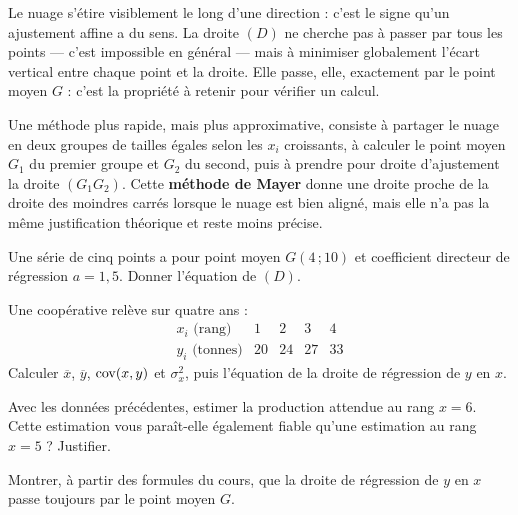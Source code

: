 \begin{visualisation}
\begin{center}
\end{center}

Le nuage s'étire visiblement le long d'une direction : c'est le signe qu'un
ajustement affine a du sens. La droite $(D)$ ne cherche pas à passer par tous
les points — c'est impossible en général — mais à minimiser globalement
l'écart vertical entre chaque point et la droite. Elle passe, elle,
exactement par le point moyen $G$ : c'est la propriété à retenir pour vérifier
un calcul.
\end{visualisation}

\begin{remarque}
Une méthode plus rapide, mais plus approximative, consiste à partager le
nuage en deux groupes de tailles égales selon les $x_{i}$ croissants, à
calculer le point moyen $G_{1}$ du premier groupe et $G_{2}$ du second, puis
à prendre pour droite d'ajustement la droite $\left(G_{1}G_{2}\right)$. Cette
\textbf{méthode de Mayer} donne une droite proche de la droite des moindres
carrés lorsque le nuage est bien aligné, mais elle n'a pas la même
justification théorique et reste moins précise.
\end{remarque}

\begin{entrainement}
\exo[\niveau{1}] Une série de cinq points a pour point moyen
$G(4\,;10)$ et coefficient directeur de régression $a = 1{,}5$. Donner
l'équation de $(D)$.

\exo[\niveau{2}] Une coopérative relève sur quatre ans :
\[
  \begin{array}{c|cccc}
    x_{i} \text{ (rang)} & 1 & 2 & 3 & 4 \\
    \hline
    y_{i} \text{ (tonnes)} & 20 & 24 & 27 & 33
  \end{array}
\]
Calculer $\overline{x}$, $\overline{y}$, $\operatorname{cov}(x,y)$ et $\sigma_{x}^{2}$,
puis l'équation de la droite de régression de $y$ en $x$.

\exo[\niveau{2}] Avec les données précédentes, estimer la production
attendue au rang $x = 6$. Cette estimation vous paraît-elle également
fiable qu'une estimation au rang $x = 5$ ? Justifier.

\exo[\niveau{3}] Montrer, à partir des formules du cours, que la droite de
régression de $y$ en $x$ passe toujours par le point moyen $G$.
\end{entrainement}

